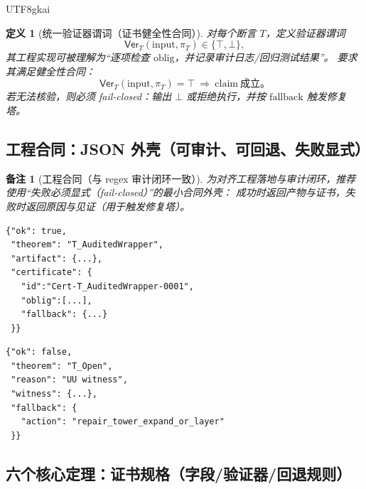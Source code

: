 \documentclass[12pt]{article}
\newtheorem{definition}{定义}[section]
\newtheorem{remark}{备注}[section]
\begin{document}
\begin{CJK*}{UTF8}{gkai}
\begin{definition}[统一验证器谓词（证书健全性合同）]
\label{def:certificate-verifier-predicate}
对每个断言 $T$，定义验证器谓词
\[
  \mathsf{Ver}_T(\mathrm{input},\pi_T)\in\{\top,\bot\},
\]
其工程实现可被理解为“逐项检查 $\mathrm{oblig}$，并记录审计日志/回归测试结果”。
要求其满足健全性合同：
\[
  \mathsf{Ver}_T(\mathrm{input},\pi_T)=\top\ \Longrightarrow\ \mathrm{claim}\ \text{成立。}
\]
若无法核验，则必须 fail-closed：输出 $\bot$ 或拒绝执行，并按 $\mathrm{fallback}$ 触发修复塔。
\end{definition}

\subsection{工程合同：JSON 外壳（可审计、可回退、失败显式）}
\label{sec:certschema-json}

\begin{remark}[工程合同（与 regex 审计闭环一致）]
为对齐工程落地与审计闭环，推荐使用“失败必须显式（fail-closed）”的最小合同外壳：
成功时返回产物与证书，失败时返回原因与见证（用于触发修复塔）。
\end{remark}

\begin{verbatim}
{"ok": true,
 "theorem": "T_AuditedWrapper",
 "artifact": {...},
 "certificate": {
   "id":"Cert-T_AuditedWrapper-0001",
   "oblig":[...],
   "fallback": {...}
 }}
\end{verbatim}

\begin{verbatim}
{"ok": false,
 "theorem": "T_Open",
 "reason": "UU witness",
 "witness": {...},
 "fallback": {
   "action": "repair_tower_expand_or_layer"
 }}
\end{verbatim}

\subsection{六个核心定理：证书规格（字段/验证器/回退规则）}
\label{sec:certschema-six-theorems}


\end{CJK*}
\end{document}
